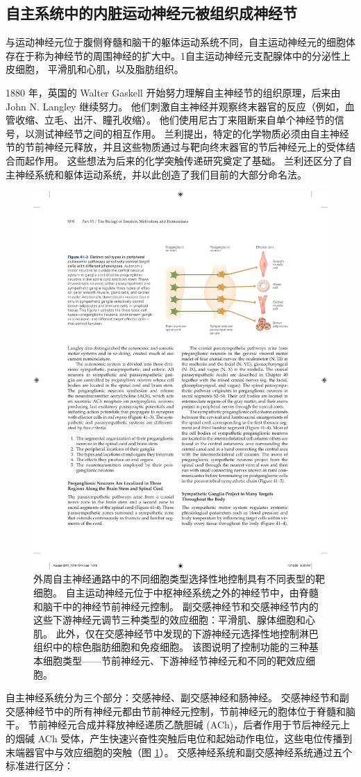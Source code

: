 \subsection{自主系统中的内脏运动神经元被组织成神经节}
与运动神经元位于腹侧脊髓和脑干的躯体运动系统不同，自主运动神经元的细胞体存在于称为神经节的周围神经的扩大中。1自主运动神经元支配腺体中的分泌性上皮细胞， 平滑肌和心肌，以及脂肪组织。

1880 年，英国的 Walter Gaskell 开始努力理解自主神经节的组织原理，后来由 John N. Langley 继续努力。 他们刺激自主神经并观察终末器官的反应（例如，血管收缩、立毛、出汗、瞳孔收缩）。 他们使用尼古丁来阻断来自单个神经节的信号，以测试神经节之间的相互作用。 兰利提出，特定的化学物质必须由自主神经节的节前神经元释放，并且这些物质通过与靶向终末器官的节后神经元上的受体结合而起作用。 这些想法为后来的化学突触传递研究奠定了基础。 兰利还区分了自主神经系统和躯体运动系统，并以此创造了我们目前的大部分命名法。

\begin{figure}[htbp]
	\centering
	\includegraphics[width=0.6\linewidth]{chap41/fig_41_3}
	\caption{外周自主神经通路中的不同细胞类型选择性地控制具有不同表型的靶细胞。 自主运动神经元位于中枢神经系统之外的神经节中，由脊髓和脑干中的神经节前神经元控制。 副交感神经节和交感神经节内的这些下游神经元调节三种类型的效应细胞：平滑肌、腺体细胞和心肌。 此外，仅在交感神经节中发现的下游神经元选择性地控制淋巴组织中的棕色脂肪细胞和免疫细胞。 该图说明了控制功能的三种基本细胞类型——节前神经元、下游神经节神经元和不同的靶效应细胞。}
	\label{fig:41_3}
\end{figure}

自主神经系统分为三个部分：交感神经、副交感神经和肠神经。 交感神经节和副交感神经节中的所有神经元都由节前神经元控制，节前神经元的胞体位于脊髓和脑干。 
节前神经元合成并释放神经递质乙酰胆碱 (ACh)，后者作用于节后神经元上的烟碱 ACh 受体，产生快速兴奋性突触后电位和起始动作电位，这些电位传播到末端器官中与效应细胞的突触（图 \ref{fig:41_3}）。 
交感神经系统和副交感神经系统通过五个标准进行区分：

